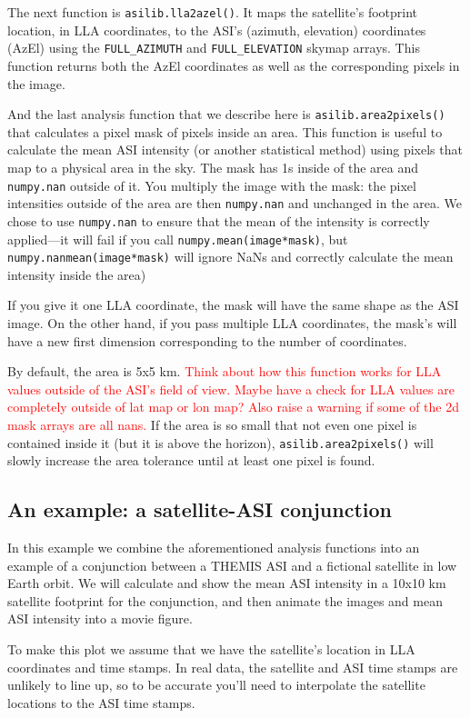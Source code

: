 \documentclass[draft]{agujournal2019}
\begin{document}
The next function is \verb|asilib.lla2azel()|. It maps the satellite's footprint location, in LLA coordinates, to the ASI's (azimuth, elevation) coordinates (AzEl) using the \verb|FULL_AZIMUTH| and \verb|FULL_ELEVATION| skymap arrays. This function returns both the AzEl coordinates as well as the corresponding pixels in the image.

And the last analysis function that we describe here is \verb|asilib.area2pixels()| that calculates a pixel mask of pixels inside an area. This function is useful to calculate the mean ASI intensity (or another statistical method) using pixels that map to a physical area in the sky. The mask has 1s inside of the area and \verb|numpy.nan| outside of it. You multiply the image with the mask: the pixel intensities outside of the area are then \verb|numpy.nan| and unchanged in the area. We chose to use \verb|numpy.nan| to ensure that the mean of the intensity is correctly applied---it will fail if you call \verb|numpy.mean(image*mask)|, but \verb|numpy.nanmean(image*mask)| will ignore NaNs and correctly calculate the mean intensity inside the area)

If you give it one LLA coordinate, the mask will have the same shape as the ASI image. On the other hand, if you pass multiple LLA coordinates, the mask's will have a new first dimension corresponding to the number of coordinates.

By default, the area is 5x5 km. \textcolor{red}{Think about how this function works for LLA values outside of the ASI's field of view. Maybe have a check for LLA values are completely outside of lat map or lon map? Also raise a warning if some of the 2d mask arrays are all nans.} If the area is so small that not even one pixel is contained inside it (but it is above the horizon), \verb|asilib.area2pixels()| will slowly increase the area tolerance until at least one pixel is found.

\subsection{An example: a satellite-ASI conjunction}\label{satellite_conjunction}
In this example we combine the aforementioned analysis functions into an example of a conjunction between a THEMIS ASI and a fictional satellite in low Earth orbit. We will calculate and show the mean ASI intensity in a 10x10 km satellite footprint for the conjunction, and then animate the images and mean ASI intensity into a movie figure.

To make this plot we assume that we have the satellite's location in LLA coordinates and time stamps. In real data, the satellite and ASI time stamps are unlikely to line up, so to be accurate you'll need to interpolate the satellite locations to the ASI time stamps. 
\end{document}
